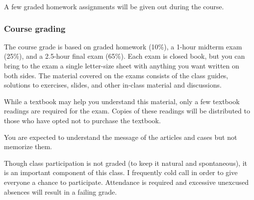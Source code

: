 \documentclass[12pt]{article}
\begin{document}
A few graded homework assignments will be given out during the course.

\subsubsection*{Course grading}

The course grade is based on graded homework (10\%), a 1-hour midterm exam (25\%), and a 2.5-hour final exam (65\%). Each exam is closed book, but you can bring to the exam a single letter-size sheet with anything you want written on both sides. The material covered on the exams consists of the class guides, solutions to exercises, slides, and other in-class material and discussions.

While a textbook may help you understand this material, only a few textbook readings are required for the exam. Copies of these readings will be distributed to those who have opted not to purchase the textbook.

You are expected to understand the message of the articles and cases but not memorize them.

Though class participation is not graded (to keep it natural and spontaneous), it is an important component of this class. I frequently cold call in order to give everyone a chance to participate. Attendance is required and excessive unexcused absences will result in a failing grade.
\end{document}
